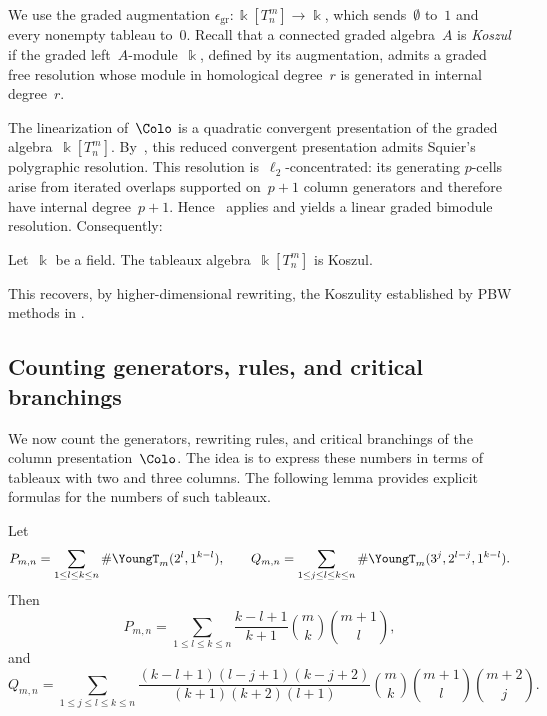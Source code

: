 \documentclass[a4paper, twoside, 11pt, english]{article}
\begin{document}
We use the graded augmentation
$\epsilon_{\mathrm{gr}}:\Bbbk[T_n^m]\to\Bbbk$,
which sends~$\emptyset$ to~$1$ and every nonempty tableau to~$0$.
Recall that a connected graded algebra~$A$ is \emph{Koszul}
if the graded left~$A$-module~$\Bbbk$, defined by its
augmentation, admits a graded free resolution whose module
in homological degree~$r$ is generated in internal degree~$r$.

The linearization of~$\Colo$ is a quadratic convergent presentation of
the graded algebra~$\Bbbk[T_n^m]$.
By~\cite[Theorem~6.2.4]{GuiraudHoffbeckMalbos19}, this reduced
convergent presentation admits Squier's polygraphic
resolution. This resolution is~$\ell_2$-concentrated:
its generating $p$-cells arise from iterated overlaps
supported on~$p+1$ column generators and therefore have
internal degree~$p+1$.
 Hence~\cite[Proposition~7.2.2]{GuiraudHoffbeckMalbos19} applies and yields a
linear graded bimodule resolution. Consequently:

\begin{corollary}
\label{cor:Koszul}
Let~$\Bbbk$ be a field. The tableaux algebra~$\Bbbk[T_n^m]$ is Koszul.
\end{corollary}

This recovers, by higher-dimensional rewriting, the Koszulity established
by PBW methods in
\cite[Corollary~2.14]{DaughertyGonzalezMunizOcalPanTorres25}.




\subsection{Counting generators, rules, and critical branchings}
We now count the generators, rewriting rules, and critical branchings of the
column presentation~$\Colo$.
The idea is to express these numbers in terms of tableaux with two and three
columns.
The following lemma provides explicit formulas for the numbers of such tableaux.

\begin{lemma}
\label{lem:PmnnQmnn}
Let
\[\displaystyle 
P_{m,n}
=
\sum_{1\le l\le k\le n}\#\YoungT_m(2^l,1^{k-l}),
\qquad
Q_{m,n}
=
\sum_{1\le j\le l\le k\le n}\#\YoungT_m(3^j,2^{l-j},1^{k-l}).
\]
Then
\[\displaystyle 
P_{m,n}
=
\sum_{1\le l\le k\le n}
\frac{k-l+1}{k+1}\binom{m}{k}\binom{m+1}{l},
\]
and
\[\displaystyle 
Q_{m,n}
=
\sum_{1\le j\le l\le k\le n}
\frac{(k-l+1)(l-j+1)(k-j+2)}
{(k+1)(k+2)(l+1)}
\binom{m}{k}\binom{m+1}{l}\binom{m+2}{j}.
\]
\end{lemma}
\end{document}
